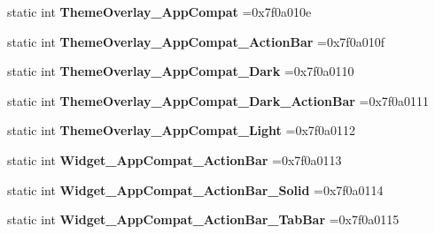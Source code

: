\begin{DoxyCompactItemize}
static int {\bfseries Theme\+Overlay\+\_\+\+App\+Compat} =0x7f0a010e
\item 
\mbox{\label{classandroid_1_1support_1_1v7_1_1appcompat_1_1R_1_1style_a320df909c55291240b5b47e6046f706b}} 
static int {\bfseries Theme\+Overlay\+\_\+\+App\+Compat\+\_\+\+Action\+Bar} =0x7f0a010f
\item 
\mbox{\label{classandroid_1_1support_1_1v7_1_1appcompat_1_1R_1_1style_a9ac744757db60dc396c7a009086d80a1}} 
static int {\bfseries Theme\+Overlay\+\_\+\+App\+Compat\+\_\+\+Dark} =0x7f0a0110
\item 
\mbox{\label{classandroid_1_1support_1_1v7_1_1appcompat_1_1R_1_1style_ad0f94b5171b3e641f075f83ddd8c4dee}} 
static int {\bfseries Theme\+Overlay\+\_\+\+App\+Compat\+\_\+\+Dark\+\_\+\+Action\+Bar} =0x7f0a0111
\item 
\mbox{\label{classandroid_1_1support_1_1v7_1_1appcompat_1_1R_1_1style_a3f3dae3f22e8ed441367ee50dae27461}} 
static int {\bfseries Theme\+Overlay\+\_\+\+App\+Compat\+\_\+\+Light} =0x7f0a0112
\item 
\mbox{\label{classandroid_1_1support_1_1v7_1_1appcompat_1_1R_1_1style_a88888ef1ffea6fc0740a8fd13532152f}} 
static int {\bfseries Widget\+\_\+\+App\+Compat\+\_\+\+Action\+Bar} =0x7f0a0113
\item 
\mbox{\label{classandroid_1_1support_1_1v7_1_1appcompat_1_1R_1_1style_a0b98f12abafbad65412036601b0a50f9}} 
static int {\bfseries Widget\+\_\+\+App\+Compat\+\_\+\+Action\+Bar\+\_\+\+Solid} =0x7f0a0114
\item 
\mbox{\label{classandroid_1_1support_1_1v7_1_1appcompat_1_1R_1_1style_a9b1f05918a075bc747b2b7c1cd51b7c4}} 
static int {\bfseries Widget\+\_\+\+App\+Compat\+\_\+\+Action\+Bar\+\_\+\+Tab\+Bar} =0x7f0a0115
\item 
\mbox{\label{classandroid_1_1support_1_1v7_1_1appcompat_1_1R_1_1style_ac8a4380640d004023ae781ed98d3c1d3}} 

\end{DoxyCompactItemize}
